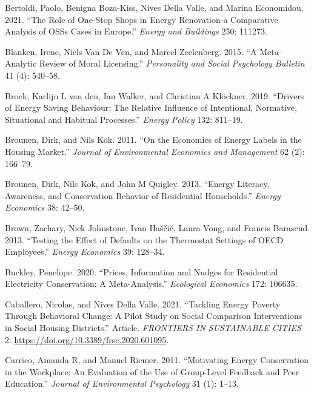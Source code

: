 \documentclass[
  11pt,
  captions=heading]{scrreport}
\newlength{\cslhangindent}
\newlength{\cslentryspacingunit} %
\newenvironment{CSLReferences}[2] %
 {%
  \setlength{\parindent}{0pt}
  \ifodd #1
  \let\oldpar\par
  \def\par{\hangindent=\cslhangindent\oldpar}
  \fi
  \setlength{\parskip}{#2\cslentryspacingunit}
 }%
 {}
\begin{document}
\begin{CSLReferences}{1}{0}
\leavevmode{}%
Bertoldi, Paolo, Benigna Boza-Kiss, Nives Della Valle, and Marina
Economidou. 2021. {``The Role of One-Stop Shops in Energy Renovation-a
Comparative Analysis of OSSs Cases in Europe.''} \emph{Energy and
Buildings} 250: 111273.

\leavevmode{}%
Blanken, Irene, Niels Van De Ven, and Marcel Zeelenberg. 2015. {``A
Meta-Analytic Review of Moral Licensing.''} \emph{Personality and Social
Psychology Bulletin} 41 (4): 540--58.

\leavevmode{}%
Broek, Karlijn L van den, Ian Walker, and Christian A Klöckner. 2019.
{``Drivers of Energy Saving Behaviour: The Relative Influence of
Intentional, Normative, Situational and Habitual Processes.''}
\emph{Energy Policy} 132: 811--19.

\leavevmode{}%
Brounen, Dirk, and Nils Kok. 2011. {``On the Economics of Energy Labels
in the Housing Market.''} \emph{Journal of Environmental Economics and
Management} 62 (2): 166--79.

\leavevmode{}%
Brounen, Dirk, Nils Kok, and John M Quigley. 2013. {``Energy Literacy,
Awareness, and Conservation Behavior of Residential Households.''}
\emph{Energy Economics} 38: 42--50.

\leavevmode{}%
Brown, Zachary, Nick Johnstone, Ivan Haščič, Laura Vong, and Francis
Barascud. 2013. {``Testing the Effect of Defaults on the Thermostat
Settings of OECD Employees.''} \emph{Energy Economics} 39: 128--34.

\leavevmode{}%
Buckley, Penelope. 2020. {``Prices, Information and Nudges for
Residential Electricity Conservation: A Meta-Analysis.''}
\emph{Ecological Economics} 172: 106635.

\leavevmode{}%
Caballero, Nicolas, and Nives Della Valle. 2021. {``Tackling Energy
Poverty Through Behavioral Change: A Pilot Study on Social Comparison
Interventions in Social Housing Districts.''} Article. \emph{FRONTIERS
IN SUSTAINABLE CITIES} 2.
\url{https://doi.org/10.3389/frsc.2020.601095}.

\leavevmode{}%
Carrico, Amanda R, and Manuel Riemer. 2011. {``Motivating Energy
Conservation in the Workplace: An Evaluation of the Use of Group-Level
Feedback and Peer Education.''} \emph{Journal of Environmental
Psychology} 31 (1): 1--13.


\end{CSLReferences}
\end{document}

